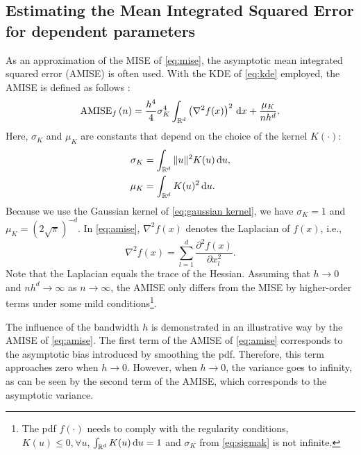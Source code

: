 \subsection{Estimating the Mean Integrated Squared Error for dependent parameters}
\label{sec:mise dependent}

As an approximation of the MISE of \cref{eq:mise}, the asymptotic mean integrated squared error (AMISE) is often used. With the KDE of \cref{eq:kde} employed, the AMISE is defined as follows \cite{marron1992exact}:
\begin{equation}
	\label{eq:amise}
	\textup{AMISE}_{f} \left( n \right) = \frac{h^4}{4} \sigma_K^4 \int_{\mathbb{R}^d} \left( \nabla^2 f(x) \right)^2 \mathrm{\,d} x + \frac{\mu_K}{nh^d}.
\end{equation}
Here, $\sigma_K$ and $\mu_K$ are constants that depend on the choice of the kernel $K(\cdot)$:
\begin{align}
	\sigma_K &= \int_{\mathbb{R}^d} \|u\|^2 K(u) \mathrm{\,d} u, \label{eq:sigmak} \\
	\mu_K &= \int_{\mathbb{R}^d} K(u)^2 \mathrm{\,d} u.
\end{align}
Because we use the Gaussian kernel of \cref{eq:gaussian kernel}, we have $\sigma_K=1$ and $\mu_K=(2\sqrt{\pi})^{-d}$. In \cref{eq:amise}, $\nabla^2 f(x)$ denotes the Laplacian of $f(x)$, i.e., 
\begin{equation}
	\nabla^2 f(x) = \sum_{l=1}^d \frac{\partial^2 f(x)}{\partial x_l^2}.
\end{equation}
Note that the Laplacian equals the trace of the Hessian. Assuming that $h \rightarrow 0$ and $nh^d \rightarrow \infty$ as $n \rightarrow \infty$, the AMISE only differs from the MISE by higher-order terms \cstart under some mild conditions\footnote{The pdf $f(\cdot)$ needs to comply with the regularity conditions, $K(u) \leq 0, \forall u$, $\int_{\mathbb{R}^d} K(u) \mathrm{\,d} u = 1$ and $\sigma_K$ from \cref{eq:sigmak} is not infinite.}\cend \cite{silverman1986density}.

The influence of the bandwidth $h$ is demonstrated in an illustrative way by the AMISE of \cref{eq:amise}. The first term of the AMISE of \cref{eq:amise} corresponds to the asymptotic bias introduced by smoothing the pdf. Therefore, this term approaches zero when $h \rightarrow 0$. However, when $h \rightarrow 0$, the variance goes to infinity, as can be seen by the second term of the AMISE, which corresponds to the asymptotic variance. 

